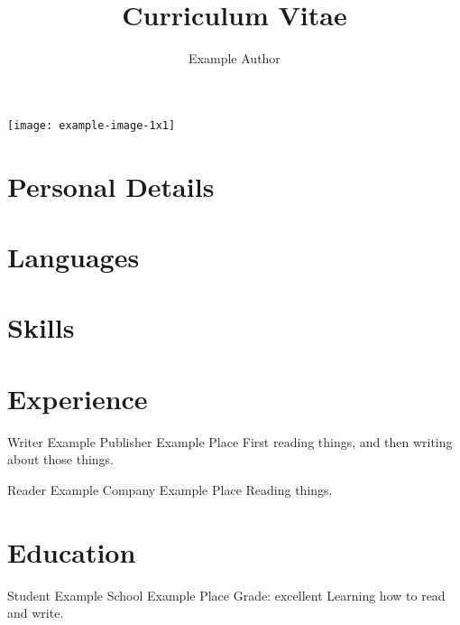 \documentclass[
  biblatex,
  signcv,
  14pt,a4paper
]{polycv}
\title{Curriculum Vitae}
\author{Example Author}
\begin{document}
\begin{polycvfirstpage}
  \nocite{*}%
  \begin{polycvsidebar}
  
  \texttt{[image: example-image-1x1]}\\[2ex]
  
  \section{Personal Details}
  \polycvlineaddress
  \polycvlineemail
  \polycvlinephone
  \polycvlinemobile
  \polycvlineorcid
  \polycvlinegithub
  \null
  
  \section{Languages}
  
  \section{Skills}
  
  \end{polycvsidebar}%
  \section{Experience}
  {Writer}
  {Example Publisher}
  {Example Place}
  {}
  {First reading things, and then writing about those things.}
  
  {Reader}
  {Example Company}
  {Example Place}
  {}
  {Reading things.}
  
  \section{Education}
  {Student}
  {Example School}
  {Example Place}
  {Grade: excellent}
  {Learning how to read and write.}
  

\end{polycvfirstpage}
\end{document}
